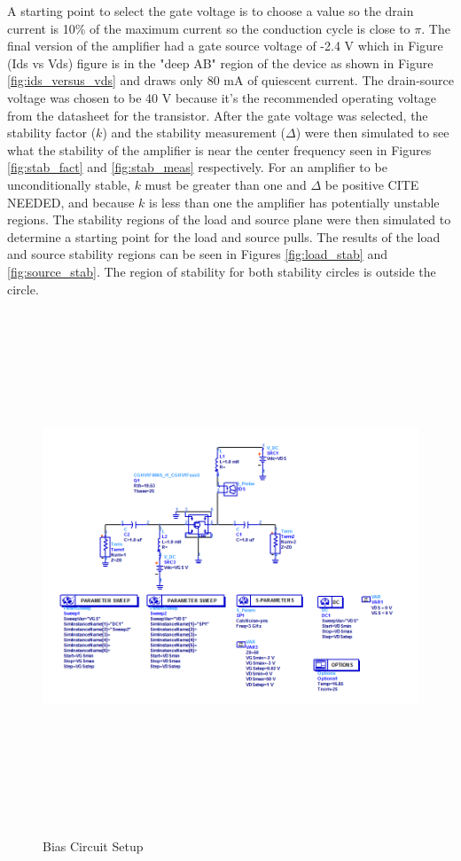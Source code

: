 A starting point to select the gate voltage is to choose a value so the drain current is 10\% of the maximum current so the conduction cycle is close to $\pi$. The final version of the amplifier had a gate source voltage of -2.4 V which in Figure (Ids vs Vds) figure is in the "deep AB" region of the device as shown in Figure \ref{fig:ids_versus_vds} and draws only 80 mA of quiescent current. The drain-source voltage was chosen to be 40 V because it's the recommended operating voltage from the datasheet for the transistor. After the gate voltage was selected, the stability factor ($k$) and the stability measurement ($\Delta$) were then simulated to see what the stability of the amplifier is near the center frequency seen in Figures \ref{fig:stab_fact} and \ref{fig:stab_meas} respectively. For an amplifier to be unconditionally stable, $k$ must be greater than one and $\Delta$ be positive CITE NEEDED, and because $k$ is less than one the amplifier has potentially unstable regions. The stability regions of the load and source plane were then simulated to determine a starting point for the load and source pulls. The results of the load and source stability regions can be seen in Figures \ref{fig:load_stab} and \ref{fig:source_stab}. The region of stability for both stability circles is outside the circle.


\begin{figure}
  \centering
  \includegraphics[width=6in,height=6in,keepaspectratio]{figures/simulation/bias_ckt}\\
  \caption{Bias Circuit Setup}
  \label{fig:bias_ckt}
\end{figure}

